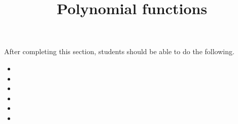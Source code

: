 \documentclass{ximera}
\title{Polynomial functions}
\begin{document}
\begin{abstract} 
\end{abstract}

\maketitle

\begin{sectionOutcomes}
After completing this section, students should be able to do the following.

\begin{itemize}
	\item 
	\item 
	\item 
        \item 
	\item 
	\item 
\end{itemize}
\end{sectionOutcomes}
\end{document}
